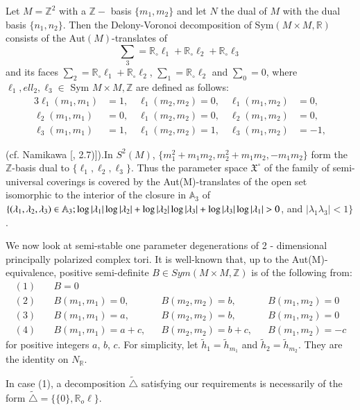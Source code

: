 Let $M= \mathbb{Z}^2$ with a $\mathbb{Z}-$ basis $\{m_1, m_2 \}$ and
let $N$ the dual of $M$ with the dual basis $\{n_1, n_2\}$. Then the
Delony-Voronoi decomposition of Sym$(M \times M, \mathbb{R})$ consists of the
Aut$(M)$-translates of  
$$
\sum_3 = \mathbb{R}_\circ \ell_1 + \mathbb{R}_\circ \ell_2 +
\mathbb{R}_\circ \ell_3 
$$
and its faces $\sum_2 = \mathbb{R}_\circ \ell_1 + \mathbb{R}_\circ
\ell_2 $, $\sum_1 = \mathbb{R}_\circ \ell_2 $ and $\sum_0 = {0}$, where
$\ell_1, ell_2, \ell_3 \in $ Sym $M \times M, \mathbb{Z}$ are defined as
follows: 
\begin{alignat*}{3} 
\ell_1(m_1, m_1) & = 1, \quad \ell_1(m_2, m_2) = 0, \quad  \ell_1(m_1,
m_2) &= 0,\\ 
 \ell_2(m_1, m_1) & = 0, \quad  \ell_1(m_2, m_2) = 0, \quad
 \ell_2(m_1, m_2) & = 0,\\ 
 \ell_3(m_1, m_1) & = 1, \quad  \ell_1(m_2, m_2) = 1, \quad
 \ell_3(m_1, m_2) & = -1, 
\end{alignat*}

(cf. Namikawa [{}, 2.7)]).\pageoriginale In $S^2(M)$, $\{m^2_1+m_1m_2, 
m_2^2+m_1m_2,-m_1m_2\}$ form the $\mathbb{Z}$-basis dual to $\{
\ell_1, \ell_2, \ell_3 \}$. Thus the parameter space
$\mathfrak{X}^\circ$ of 
the family of semi-universal coverings is covered by the
Aut(M)-translates of the open set isomorphic to the interior of the
closure in $\mathbb{A}_3$ of $\{( \lambda_1, \lambda_2,\break \lambda_3 )
\in \mathbb{A}_3 ; \log| \lambda_1| \log|\lambda_2|+ \log|\lambda_2|
\log|\lambda_3|+ \log|\lambda_3|\log|\lambda_1|> 0$, and $
|\lambda_1\lambda_3| <1\}$. 

We now look at semi-stable one parameter degenerations of
2 - dimensional principally polarized complex tori. It is well-known
that, up to the Aut(M)-equivalence, positive semi-definite $B \in
Sym(M \times M, \mathbb{Z})$ is of the following from:  
\begin{align*}
(1) \quad & B=0\\
(2) \quad & B(m_1, m_1)= 0,   && B(m_2, m_2) = b,   && B(m_1, m_2)= 0\\
(3) \quad & B(m_1, m_1)= a,   && B(m_2, m_2) = b,   && B(m_1, m_2)= 0\\
(4) \quad & B(m_1, m_1)= a+c, && B(m_2, m_2) = b+c, && B(m_1, m_2)= -c
 \end{align*} 
 for positive integers $a$, $b$, $c$. For simplicity, let $\tilde{h}_1=
 \tilde{h}_{m_1}$ and  $\tilde{h}_2= \tilde{h}_{m_2}$. They are the
 identity on $N_\mathbb{R}$. 
 
 In case (1), a decomposition  $\tilde{\triangle}$ satisfying our
 requirements is necessarily of the form $\tilde{\triangle}= \{\{0\},
 \mathbb{R}_o \ell\}$. 
 
